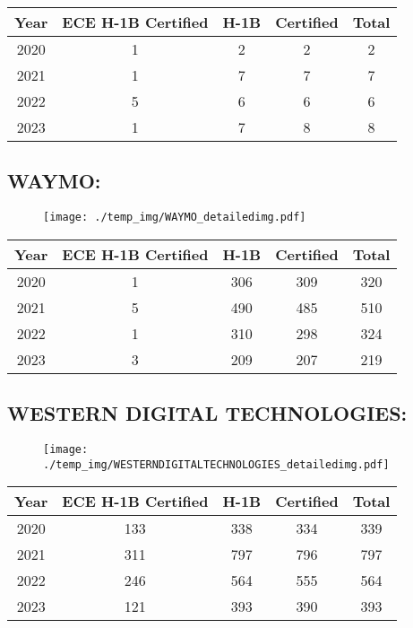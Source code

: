 \documentclass{article}%
\begin{document}
%
\begin{longtable}{c|c|c|c|c}%
\hline%
Year&ECE H{-}1B Certified&H{-}1B&Certified&Total\\%
\hline%
2020&1&2&2&2\\%
\hline%
2021&1&7&7&7\\%
\hline%
2022&5&6&6&6\\%
\hline%
2023&1&7&8&8\\%
\hline%
\end{longtable}

%
\newpage%
\subsection{WAYMO:}%
\label{subsec:WAYMO}%
\label{WAYMOdetailed}%


\begin{figure}[htbp]%
\centering%
\texttt{[image: ./temp\_img/WAYMO\_detailedimg.pdf]}%
\end{figure}

%
\begin{longtable}{c|c|c|c|c}%
\hline%
Year&ECE H{-}1B Certified&H{-}1B&Certified&Total\\%
\hline%
2020&1&306&309&320\\%
\hline%
2021&5&490&485&510\\%
\hline%
2022&1&310&298&324\\%
\hline%
2023&3&209&207&219\\%
\hline%
\end{longtable}

%
\newpage%
\subsection{WESTERN DIGITAL TECHNOLOGIES:}%
\label{subsec:WESTERNDIGITALTECHNOLOGIES}%
\label{WESTERNDIGITALTECHNOLOGIESdetailed}%


\begin{figure}[htbp]%
\centering%
\texttt{[image: ./temp\_img/WESTERNDIGITALTECHNOLOGIES\_detailedimg.pdf]}%
\end{figure}

%
\begin{longtable}{c|c|c|c|c}%
\hline%
Year&ECE H{-}1B Certified&H{-}1B&Certified&Total\\%
\hline%
2020&133&338&334&339\\%
\hline%
2021&311&797&796&797\\%
\hline%
2022&246&564&555&564\\%
\hline%
2023&121&393&390&393\\%
\hline%
\end{longtable}
\end{document}
